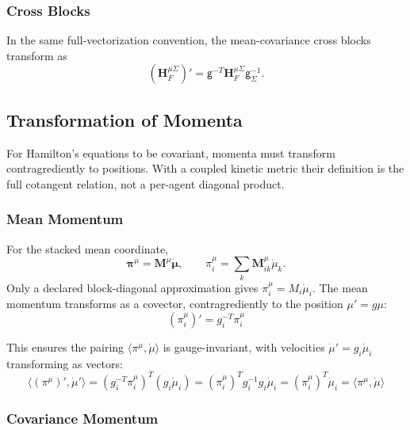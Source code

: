 \documentclass[12pt]{article}
\begin{document}
\subsubsection{Cross Blocks}

In the same full-vectorization convention, the mean-covariance cross blocks transform as
\begin{equation}
\boxed{(\mathbf H_F^{\mu\Sigma})'=\mathsf g^{-T}\mathbf H_F^{\mu\Sigma}\mathsf g_\Sigma^{-1}.}
\label{eq:stacked_mixed_hessian_congruence}
\end{equation}

\subsection{Transformation of Momenta}

For Hamilton's equations to be covariant, momenta must transform contragrediently to positions.  With a coupled kinetic metric their definition is the full cotangent relation, not a per-agent diagonal product.

\subsubsection{Mean Momentum}

For the stacked mean coordinate,
\begin{equation}
\boldsymbol\pi^\mu=\mathbf M^\mu\dot{\boldsymbol\mu},
\qquad
\boxed{\pi_i^\mu=\sum_k\mathbf M_{ik}^\mu\dot\mu_k.}
\end{equation}
Only a declared block-diagonal approximation gives $\pi_i^\mu=M_i\dot\mu_i$.  The mean momentum transforms as a covector, contragrediently to the position $\mu'=g\mu$:
\begin{equation}
\boxed{(\pi_i^\mu)' = g_i^{-T} \pi_i^\mu}
\end{equation}

This ensures the pairing $\langle\pi^\mu, \dot{\mu}\rangle$ is gauge-invariant, with velocities $\dot{\mu}' = g_i\dot{\mu}_i$ transforming as vectors:
\begin{equation}
\langle(\pi^\mu)', \dot{\mu}'\rangle = (g_i^{-T}\pi_i^\mu)^T(g_i\dot{\mu}_i) = (\pi_i^\mu)^T g_i^{-1} g_i \dot{\mu}_i = (\pi_i^\mu)^T\dot{\mu}_i = \langle\pi^\mu, \dot{\mu}\rangle
\end{equation}

\subsubsection{Covariance Momentum}
\end{document}
